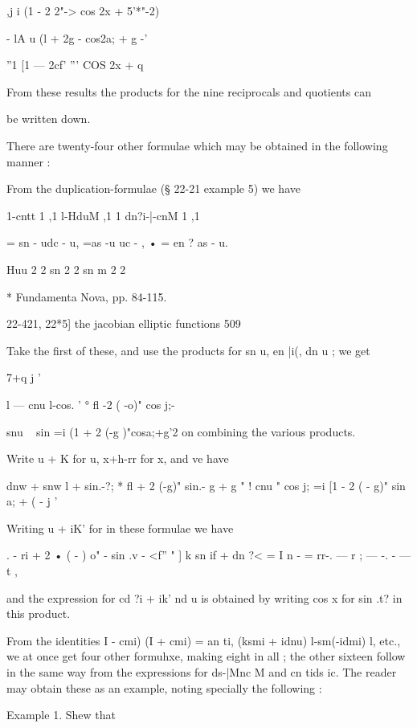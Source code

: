   ,j i (1 - 2 2"-> cos 2x + 5'*"-2) 

- lA u (l + 2g -  cos2a; + g -'  



''1 [1 — 2cf' '''  COS 2x + q 

From these results the products for the nine reciprocals and quotients can 

be written down. 

There are twenty-four other formulae which may be obtained in the following manner : 

From the duplication-formulae (§ 22-21 example 5) we have 

1-cntt 1 ,1 l-HduM ,1 1 dn?i-|-cnM 1 ,1 

= sn - udc - u, =as -u uc -  , • = en ?  as - u. 

Huu 2 2 sn   2 2 sn m 2 2 

* Fundamenta Nova, pp. 84-115. 



22-421, 22*5] the jacobian elliptic functions 509 

Take the first of these, and use the products for sn  u, en |i(, dn u ; we get 

7+q j ' 



l — cnu l-cos. ' °  fl -2 ( -o)" cos j;- 



snu ~ sin   =i (1 + 2 (-g )"cosa;+g'2 
on combining the various products. 

Write u + K for u, x+h-rr for x, and ve have 

dnw +  snw l + sin.-?; * fl + 2 (-g)" sin.- g + g " ! 
cnu "  cos j;  =i [1 - 2 ( - g)" sin a; + ( - j ' 

Writing u + iK' for   in these formulae we have 

. - ri + 2 • ( - )  o" -  sin .v - <f'' "  ] 
k sn if +   dn ?< = I n - =  rr-. — r ; — -.  - —   t , 

and the expression for   cd ?i + ik' nd u is obtained by writing cos x for sin .t? in this product. 

From the identities  I - cmi) (I + cmi) = an  ti, (ksmi + idnu)  l-sm(-idmi) l, etc., 
we at once get four other formuhxe, making eight in all ; the other sixteen follow in the 
same way from the expressions for ds-|Mnc M and cn tids ic. The reader may obtain 
these as an example, noting specially the following : 

Example 1. Shew that 

